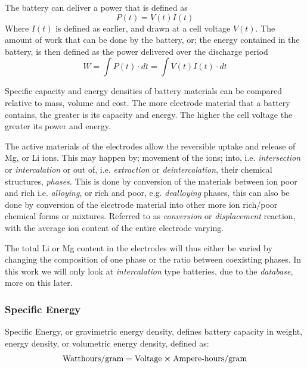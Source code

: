 	The battery can deliver a power that is defined as
	\begin{equation}
	P(t)=V(t)I(t)
	\end{equation}
	Where $I(t)$ is defined as earlier, and drawn at a cell voltage $V(t)$. The amount of work that can be done by the battery, or; the energy contained in the battery, is then defined as the power delivered over the discharge period
	\begin{equation}
	W = \int P(t) \cdot dt = \int V(t)I(t) \cdot dt
	\end{equation}
	
	Specific capacity and energy densities of battery materials can be compared relative to mass, volume and cost. The more electrode material that a battery contains, the greater is its capacity and energy. The higher the cell voltage the greater its power and energy. 
	
	The active materials of the electrodes allow the reversible uptake and release of Mg, or Li ions. This may happen by; movement of the  ions; into, i.e. \textit{intersection} or \textit{intercalation} or out of, i.e. \textit{extraction} or \textit{deintercalation}, their chemical structures, \textit{phases}. This is done by conversion of the materials between ion poor and rich i.e. \textit{alloying}, or rich and poor, e.g. \textit{dealloying} phases, this can also be done by conversion of the electrode material into other more ion rich/poor chemical forms or mixtures. Referred to as \textit{conversion} or \textit{displacement} reaction, with the average ion content of the entire electrode varying. 
	
	The total Li or Mg content in the electrodes will thus either be varied by changing the composition of one phase or the ratio between coexisting phases. In this work we will only look at \textit{intercalation} type batteries, due to the \textit{database}, more on this later.
	
	\subsubsection*{Specific Energy}
	Specific Energy, or gravimetric energy density, defines battery capacity in weight, energy density, or volumetric energy density, defined as: 
	\begin{equation}
	\text{Watthours/gram} = \text{Voltage} \cross \text{Ampere-hours/gram}
	\end{equation}	
	
	


